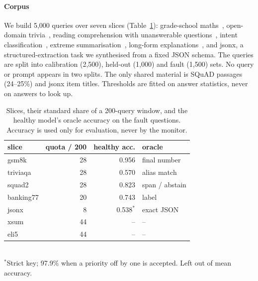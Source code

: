\documentclass[11pt]{article}
\begin{document}
\paragraph{Corpus}
We build 5{,}000 queries over seven slices (Table~\ref{tab:corpus}): grade-school
maths~\citep{cobbe2021gsm8k}, open-domain trivia~\citep{joshi2017triviaqa},
reading comprehension with unanswerable questions~\citep{rajpurkar2018squad2},
intent classification~\citep{casanueva2020banking77}, extreme
summarisation~\citep{narayan2018xsum}, long-form explanations~\citep{fan2019eli5},
and \textsf{jsonx}, a structured-extraction task we synthesised from a fixed JSON
schema. The queries are split into calibration (2{,}500), held-out (1{,}000) and
fault (1{,}500) sets. No query or prompt appears in two splits. The only shared
material is SQuAD passages (24--25\%) and \textsf{jsonx} item titles. Thresholds
are fitted on answer statistics, never on answers to look up.

\begin{table}[t]
  \centering\small
  \caption{Slices, their standard share of a 200-query window, and the healthy
  model's oracle accuracy on the fault questions. Accuracy is used only for
  evaluation, never by the monitor.}
  \label{tab:corpus}
  \begin{tabular}{lrrl}
    \toprule
    slice & quota / 200 & healthy acc. & oracle \\
    \midrule
    gsm8k & 28 & 0.956 & final number \\
    triviaqa & 28 & 0.570 & alias match \\
    squad2 & 28 & 0.823 & span / abstain \\
    banking77 & 20 & 0.743 & label \\
    jsonx & 8 & 0.538$^\ast$ & exact JSON \\
    xsum & 44 & -- & -- \\
    eli5 & 44 & -- & -- \\
    \bottomrule
  \end{tabular}\\[2pt]
  {\footnotesize $^\ast$Strict key; 97.9\% when a priority off by one is accepted.
  Left out of mean accuracy.}
\end{table}
\end{document}
